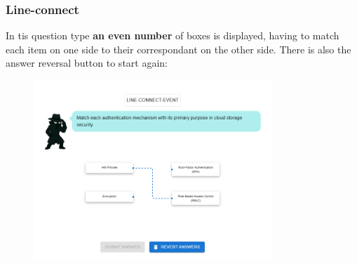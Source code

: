 \subsubsection{Line-connect}
In tis question type \textbf{an even number} of boxes is displayed, having to match each item on one side to their correspondant
on the other side. There is also the answer reversal button to start again:
\begin{figure}[htbp]
    \centering
    \includegraphics[width=0.8\textwidth]{images/Line_Connect.png}
\end{figure}